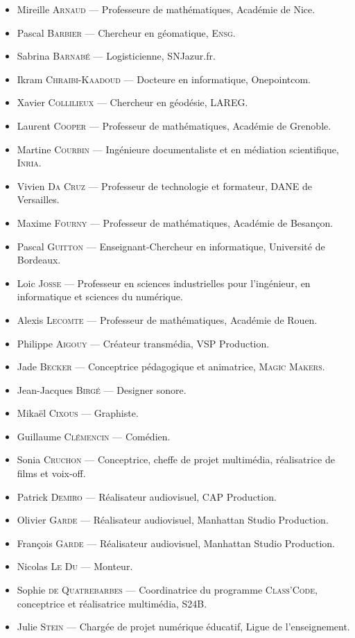{\small
\begin{itemize}\jazzitem
\item Mireille \textsc{Arnaud} --- Professeure de mathématiques, Académie de Nice.
\item Pascal \textsc{Barbier} --- Chercheur en géomatique, \textsc{Ensg}.
\item Sabrina \textsc{Barnabé} --- Logisticienne, SNJazur.fr.
\item Ikram \textsc{Chraibi-Kaadoud} --- Docteure en informatique, Onepointcom.
\item Xavier \textsc{Collilieux} --- Chercheur en géodésie, LAREG.
\item Laurent \textsc{Cooper} --- Professeur de mathématiques, Académie de Grenoble.
\item Martine \textsc{Courbin} --- Ingénieure documentaliste et en médiation scientifique, \textsc{Inria}.
\item Vivien \textsc{Da Cruz} --- Professeur de technologie et formateur, DANE de Versailles.
\item Maxime \textsc{Fourny} --- Professeur de mathématiques, Académie de Besançon.
\item Pascal \textsc{Guitton} --- Enseignant-Chercheur en informatique, Université de Bordeaux.
\item Loic \textsc{Josse} --- Professeur en sciences industrielles pour l'ingénieur, en informatique et sciences du numérique.
\item Alexis \textsc{Lecomte} --- Professeur de mathématiques, Académie de Rouen.
\end{itemize}}



{\small
\begin{itemize}\jazzitem
\item Philippe \textsc{Aigouy} --- Créateur transmédia, VSP Production.
\item Jade \textsc{Becker} --- Conceptrice pédagogique et animatrice, \textsc{Magic Makers}.
\item Jean-Jacques \textsc{Birgé} --- Designer sonore.
\item Mikaël \textsc{Cixous} --- Graphiste.
\item Guillaume \textsc{Clémencin} --- Comédien.
\item Sonia \textsc{Cruchon} --- Conceptrice, cheffe de projet multimédia, réalisatrice de films et voix-off.
\item Patrick \textsc{Demiro} --- Réalisateur audiovisuel, CAP Production.
\item Olivier \textsc{Garde} --- Réalisateur audiovisuel, Manhattan Studio Production.
\item François \textsc{Garde} --- Réalisateur audiovisuel, Manhattan Studio Production.
\item Nicolas \textsc{Le Du} --- Monteur.
\item Sophie \textsc{de Quatrebarbes} --- Coordinatrice du programme \textsc{Class’Code}, conceptrice et réalisatrice multimédia, S24B.
\item Julie \textsc{Stein} --- Chargée de projet numérique éducatif, Ligue de l'enseignement.
\end{itemize}}

